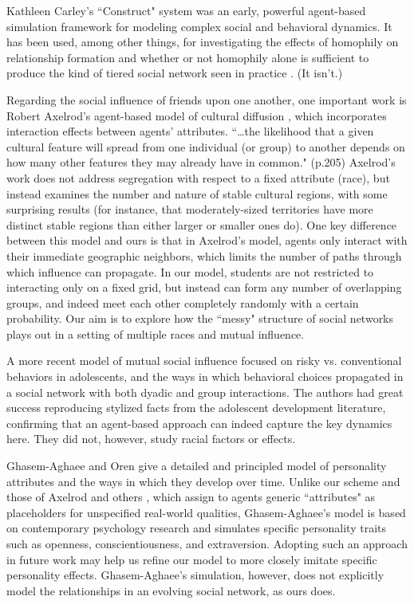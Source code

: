 Kathleen Carley's ``Construct" system
\cite{carley_theory_1991,schreiber_construct-multi-agent_2004} was an early,
powerful agent-based simulation framework for modeling complex social and
behavioral dynamics. It has been used, among other things, for investigating
the effects of homophily on relationship formation and whether or not
homophily alone is sufficient to produce the kind of tiered social network
seen in practice \cite{hirshman_leaving_2011}. (It isn't.)

Regarding the social influence of friends upon one another, one important work
is Robert Axelrod's agent-based model of cultural diffusion
\cite{axelrod_dissemination_1997}, which incorporates interaction effects
between agents' attributes. ``\dots the likelihood that a given cultural
feature will spread from one individual (or group) to another depends on how
many other features they may already have in common." (p.205) Axelrod's work
does not address segregation with respect to a fixed attribute (race), but
instead examines the number and nature of stable cultural regions, with some
surprising results (for instance, that moderately-sized territories have more
distinct stable regions than either larger or smaller ones do). One key
difference between this model and ours is that in Axelrod's model, agents only
interact with their immediate geographic neighbors, which limits the number of
paths through which influence can propagate. In our model, students are not
restricted to interacting only on a fixed grid, but instead can form any
number of overlapping groups, and indeed meet each other completely randomly
with a certain probability. Our aim is to explore how the ``messy" structure
of social networks plays out in a setting of multiple races and mutual
influence.

A more recent model of mutual social influence \cite{schuhmacher_using_2014}
focused on risky vs. conventional behaviors in adolescents, and the ways in
which behavioral choices propagated in a social network with both dyadic and
group interactions. The authors had great success reproducing stylized facts
from the adolescent development literature, confirming that an agent-based
approach can indeed capture the key dynamics here. They did not, however,
study racial factors or effects.

Ghasem-Aghaee and Oren \citeyear{ghasem-aghaee_cognitive_2007} give a detailed
and principled model of personality attributes and the ways in which they
develop over time. Unlike our scheme and those of Axelrod and others
\cite{epstein_growing_1996}, which assign to agents generic ``attributes" as
placeholders for unspecified real-world qualities, Ghasem-Aghaee's model is
based on contemporary psychology research and simulates specific personality
traits such as openness, conscientiousness, and extraversion. Adopting such an
approach in future work may help us refine our model to more closely imitate
specific personality effects. Ghasem-Aghaee's simulation, however, does not
explicitly model the relationships in an evolving social network, as ours
does.

